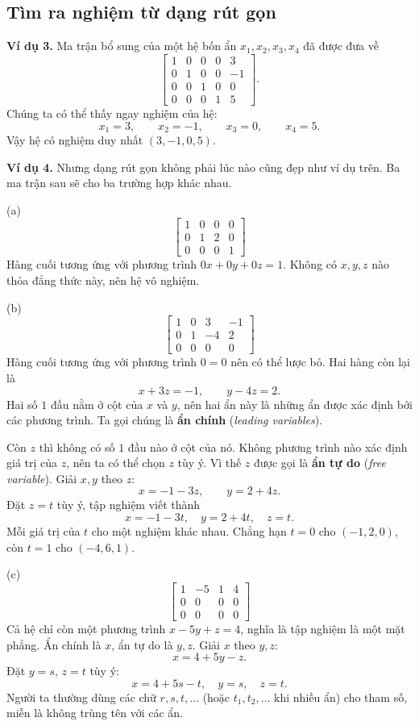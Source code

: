 \documentclass[12pt,a4paper]{article}
\begin{document}
\subsection{Tìm ra nghiệm từ dạng rút gọn}

\textbf{Ví dụ 3.} Ma trận bổ sung của một hệ bốn ẩn \(x_1,x_2,x_3,x_4\) đã được đưa về
$$
\left[ \begin{array}{cccc|c} 1 & 0 & 0 & 0 & 3 \\ 0 & 1 & 0 & 0 & -1 \\ 0 & 0 & 1 & 0 & 0 \\ 0 & 0 & 0 & 1 & 5 \end{array} \right].
$$
Chúng ta có thể thấy ngay nghiệm của hệ:
$$
x_1=3,\qquad x_2=-1,\qquad x_3=0,\qquad x_4=5.
$$
Vậy hệ có nghiệm duy nhất \((3,-1,0,5)\).

\textbf{Ví dụ 4.} Nhưng dạng rút gọn không phải lúc nào cũng đẹp như ví dụ trên. Ba ma trận sau sẽ cho ba trường hợp khác nhau.

(a)
$$
\left[ \begin{array}{ccc|c} 1 & 0 & 0 & 0 \\ 0 & 1 & 2 & 0 \\ 0 & 0 & 0 & 1 \end{array} \right]
$$
Hàng cuối tương ứng với phương trình \(0x+0y+0z=1\). Không có \(x,y,z\) nào thỏa đẳng thức này, nên hệ vô nghiệm.

(b)
$$
\left[ \begin{array}{ccc|c} 1 & 0 & 3 & -1 \\ 0 & 1 & -4 & 2 \\ 0 & 0 & 0 & 0 \end{array} \right]
$$
Hàng cuối tương ứng với phương trình \(0=0\) nên có thể lược bỏ. Hai hàng còn lại là
$$
x+3z=-1,\qquad y-4z=2.
$$
Hai số \(1\) đầu nằm ở cột của \(x\) và \(y\), nên hai ẩn này là những ẩn được xác định bởi các phương trình. Ta gọi chúng là \textbf{ẩn chính} (\emph{leading variables}).

Còn \(z\) thì không có số \(1\) đầu nào ở cột của nó. Không phương trình nào xác định giá trị của \(z\), nên ta có thể chọn \(z\) tùy ý. Vì thế \(z\) được gọi là \textbf{ẩn tự do} (\emph{free variable}). Giải \(x,y\) theo \(z\):
$$
x=-1-3z,\qquad y=2+4z.
$$
Đặt \(z=t\) tùy ý, tập nghiệm viết thành
$$
x=-1-3t,\quad y=2+4t,\quad z=t.
$$
Mỗi giá trị của \(t\) cho một nghiệm khác nhau. Chẳng hạn \(t=0\) cho \((-1,2,0)\), còn \(t=1\) cho \((-4,6,1)\).

(c)
$$
\left[ \begin{array}{ccc|c} 1 & -5 & 1 & 4 \\ 0 & 0 & 0 & 0 \\ 0 & 0 & 0 & 0 \end{array} \right]
$$
Cả hệ chỉ còn một phương trình \(x-5y+z=4\), nghĩa là tập nghiệm là một mặt phẳng. Ẩn chính là \(x\), ẩn tự do là \(y,z\). Giải \(x\) theo \(y,z\):
$$
x=4+5y-z.
$$
Đặt \(y=s\), \(z=t\) tùy ý:
$$
x=4+5s-t,\quad y=s,\quad z=t. \tag{1}
$$
Người ta thường dùng các chữ \(r,s,t,\dots\) (hoặc \(t_1,t_2,\dots\) khi nhiều ẩn) cho tham số, miễn là không trùng tên với các ẩn.
\end{document}

